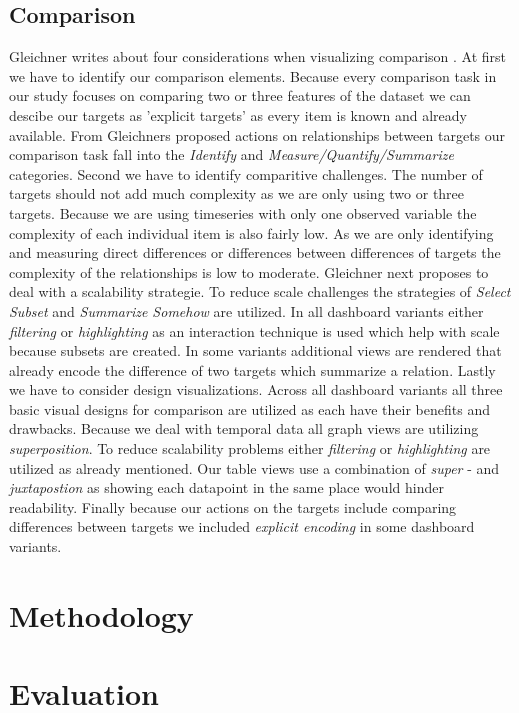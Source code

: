 \documentclass[12pt, twoside]{article}
\begin{document}
\subsection*{Comparison}
Gleichner writes about four considerations when visualizing comparison \citep*{Gleicher.2018}.
At first we have to identify our comparison elements. Because every comparison task in our
study focuses on comparing two or three features of the dataset we can descibe our targets as
'explicit targets' as every item is known and already available. From Gleichners proposed
actions on relationships between targets our comparison task fall into the \textit{Identify}
and \textit{Measure/Quantify/Summarize} categories. Second we have to identify comparitive
challenges. The number of targets should not add much complexity as we are only using two
or three targets. Because we are using timeseries with only one observed variable the
complexity of each individual item is also fairly low. As we are only identifying and
measuring direct differences or differences between differences of targets the complexity
of the relationships is low to moderate. Gleichner next proposes to deal with a scalability
strategie. To reduce scale challenges the strategies of \textit{Select Subset} and 
\textit{Summarize Somehow} are utilized. In all dashboard variants either \textit{filtering} or
\textit{highlighting} as an interaction technique is used which help with scale because subsets
are created. In some variants additional views are rendered that already encode the
difference of two targets which summarize a relation. Lastly we have to consider design
visualizations. Across all dashboard variants all three basic visual designs for comparison
are utilized as each have their benefits and drawbacks. Because we deal with temporal data
all graph views are utilizing \textit{superposition}. To reduce scalability problems either
\textit{filtering} or \textit{highlighting} are utilized as already mentioned. Our table views
use a combination of \textit{super} - and \textit{juxtapostion} as showing each datapoint in the
same place would hinder readability. Finally because our actions on the targets include comparing
differences between targets we included \textit{explicit encoding} in some dashboard variants.

\section{Methodology}

\section{Evaluation}
\end{document}
